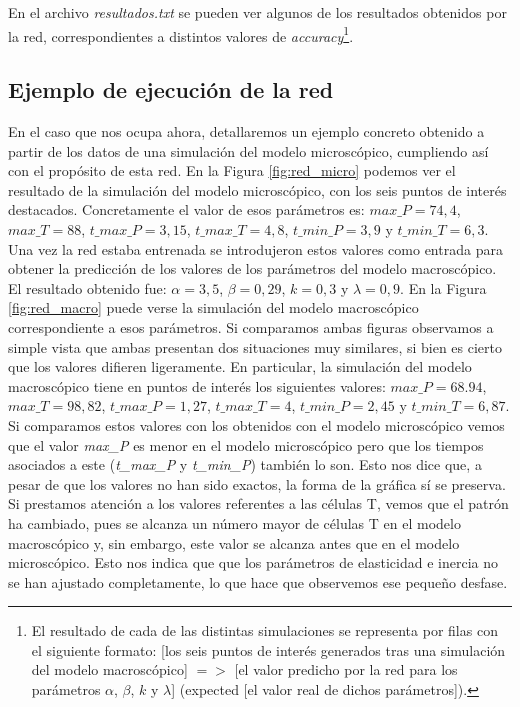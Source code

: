 En el archivo \textit{resultados.txt} se pueden ver algunos de los resultados obtenidos por la red, correspondientes a distintos valores de \textit{accuracy}\footnote{El resultado de cada de las distintas simulaciones se representa por filas con el siguiente formato: [los seis puntos de interés generados tras una simulación del modelo macroscópico] $=>$ [el valor predicho por la red para los parámetros $\alpha$, $\beta$, $k$ y $\lambda$] (expected [el valor real de dichos parámetros]).}. 


\subsection{Ejemplo de ejecución de la red}

En el caso que nos ocupa ahora, detallaremos un ejemplo concreto obtenido a partir de los datos de una simulación del modelo microscópico, cumpliendo así con el propósito de esta red. En la Figura \ref{fig:red_micro} podemos ver el resultado de la simulación del modelo microscópico, con los seis puntos de interés destacados. Concretamente el valor de esos parámetros es: $\textit{max\_P} = 74,4$, $\textit{max\_T} = 88$, $\textit{t\_max\_P} = 3,15$, $\textit{t\_max\_T} = 4,8$, $\textit{t\_min\_P} = 3,9$ y $\textit{t\_min\_T} = 6,3$. Una vez la red estaba entrenada se introdujeron estos valores como entrada para obtener la predicción de los valores de los parámetros del modelo macroscópico. El resultado obtenido fue: $\alpha = 3,5$, $\beta = 0,29$, $k = 0,3$ y $\lambda = 0,9$. En la Figura \ref{fig:red_macro} puede verse la simulación del modelo macroscópico correspondiente a esos parámetros. Si comparamos ambas figuras observamos a simple vista que ambas presentan dos situaciones muy similares, si bien es cierto que los valores difieren ligeramente. En particular, la simulación del modelo macroscópico tiene en puntos de interés los siguientes valores: $\textit{max\_P} = 68.94$, $\textit{max\_T} = 98,82$, $\textit{t\_max\_P} = 1,27$, $\textit{t\_max\_T} =4$, $\textit{t\_min\_P} = 2,45$ y $\textit{t\_min\_T} = 6,87$. Si comparamos estos valores con los obtenidos con el modelo microscópico vemos que el valor \textit{max\_P} es menor en el modelo microscópico pero que los tiempos asociados a este (\textit{t\_max\_P} y \textit{t\_min\_P}) también lo son. Esto nos dice que, a pesar de que los valores no han sido exactos, la forma de la gráfica sí se preserva. Si prestamos atención a los valores referentes a las células T, vemos que el patrón ha cambiado, pues se alcanza un número mayor de células T en el modelo macroscópico y, sin embargo, este valor se alcanza antes que en el modelo microscópico. Esto nos indica que que los parámetros de elasticidad e inercia no se han ajustado completamente, lo que hace que observemos ese pequeño desfase.



